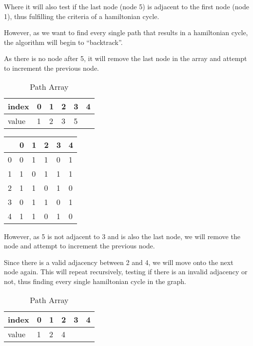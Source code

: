 Where it will also test if the last node (node 5) is adjacent to the first node
(node 1), thus fulfilling the criteria of a hamiltonian cycle.

However, as we want to find every single path that results in a hamiltonian
cycle, the algorithm will begin to “backtrack”.

As there is no node after 5, it will remove the last node in the array and
attempt to increment the previous node.

\begin{table}[H]
    \centering
    \caption{Path Array}
    \begin{tabular}{l | lllll}
        index & 0 & 1 & 2 & 3 & 4  \\
        \hline
        value & 1 & 2 & 3 & {\cellcolor[rgb]{0.933,0.804,0.804}}5 &  \\
    \end{tabular}
\end{table}

\begin{table}[H]
    \centering
    \begin{tabular}{l | lllll}
          & 0 & 1 & 2 & 3 & 4  \\
        \hline
        0 & 0 & 1 & 1 & 0 & 1  \\
        1 & 1 & 0 & 1 & 1 & 1  \\
        2 & 1 & 1 & 0 & 1 & 0  \\
        3 & 0 & 1 & 1 & 0 & 1  \\
        4 & 1 & 1 & {\cellcolor[rgb]{0.933,0.804,0.804}}0 & 1 & 0 
    \end{tabular}
\end{table}

However, as 5 is not adjacent to 3 and is also the last node, we will remove the
node and attempt to increment the previous node.

Since there is a valid adjacency between 2 and 4, we will move onto the next
node again. This will repeat recursively, testing if there is an invalid
adjacency or not, thus finding every single hamiltonian cycle in the graph.

\begin{table}[H]
    \centering
    \caption{Path Array}
    \begin{tabular}{l | lllll}
        index & 0 & 1 & 2 & 3 & 4  \\
        \hline
        value & 1 & 2 & {\cellcolor[rgb]{0.863,0.914,0.835}}4 &  &  \\
    \end{tabular}
\end{table}

